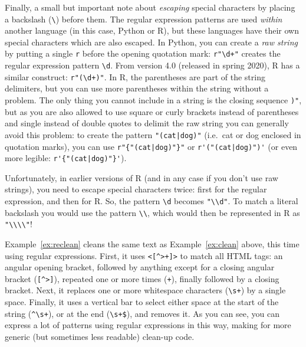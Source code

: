 Finally, a small but important note about \emph{escaping} special characters by placing a backslash (\verb|\|) before them.
The regular expression patterns are used \emph{within} another language (in this case, Python or R), but these languages have their own
special characters which are also escaped. In Python, you can create a \emph{raw string} by putting a single \verb|r| before the opening quotation mark:
\verb|r"\d+"| creates the regular expression pattern \verb|\d|.
From version 4.0 (released in spring 2020), R has a similar construct: \verb|r"(\d+)"|. In R, the parentheses are part of the string delimiters, but you can use more parentheses within the string without a problem.
The only thing you cannot include in a string is the closing sequence \verb|)"|, but as you are also allowed to use square or curly brackets instead of parentheses and single instead of double quotes to delimit the raw string you can generally avoid this problem:
to create the pattern \verb+"(cat|dog)"+ (i.e.\ cat or dog enclosed in quotation marks), you can use \verb+r"{"(cat|dog)"}"+ or \verb+r'("(cat|dog)")'+
(or even more legible: \verb+r'{"(cat|dog)"}'+).

Unfortunately, in earlier versions of R (and in any case if you don't use raw strings), you need to escape special characters twice:
first for the regular expression, and then for R. So, the pattern \verb|\d| becomes \verb|"\\d"|. To match a literal backslash you would use the pattern \verb|\\|,
which would then be represented in R as \verb|"\\\\"|!

Example~\ref{ex:reclean} cleans the same text as Example~\ref{ex:clean} above, this time using regular expressions.
First, it uses \verb|<[^>+]>| to match all HTML tags: an angular opening bracket, followed by anything except for a closing angular bracket (\verb|[^>]|), repeated one or more times (\verb|+|),
finally followed by a closing bracket.
Next, it replaces one or more whitespace characters (\verb|\s+|) by a single space.
Finally, it uses a vertical bar to select either space at the start of the string (\verb|^\s+|), or at the end  (\verb|\s+$|), and removes it. 
As you can see, you can express a lot of patterns using regular expressions in this way, making for more generic (but sometimes less readable) clean-up code. 


